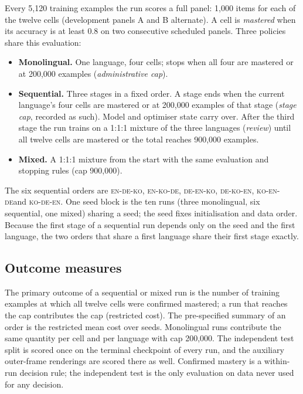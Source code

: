 \documentclass[preprint,12pt,authoryear]{elsarticle}
\newcommand{\ko}{\textsc{ko}}
\newcommand{\en}{\textsc{en}}
\newcommand{\de}{\textsc{de}}
\begin{document}
Every 5{,}120 training examples the run scores a full panel: 1{,}000 items for each of the twelve cells (development panels A and B alternate). A cell is \emph{mastered} when its accuracy is at least 0.8 on two consecutive scheduled panels. Three policies share this evaluation:

\begin{itemize}
\item \textbf{Monolingual.} One language, four cells; stops when all four are mastered or at 200{,}000 examples (\emph{administrative cap}).
\item \textbf{Sequential.} Three stages in a fixed order. A stage ends when the current language's four cells are mastered or at 200{,}000 examples of that stage (\emph{stage cap}, recorded as such). Model and optimiser state carry over. After the third stage the run trains on a 1:1:1 mixture of the three languages (\emph{review}) until all twelve cells are mastered or the total reaches 900{,}000 examples.
\item \textbf{Mixed.} A 1:1:1 mixture from the start with the same evaluation and stopping rules (cap 900{,}000).
\end{itemize}

The six sequential orders are \en-\de-\ko, \en-\ko-\de, \de-\en-\ko, \de-\ko-\en, \ko-\en-\de and \ko-\de-\en. One seed block is the ten runs (three monolingual, six sequential, one mixed) sharing a seed; the seed fixes initialisation and data order. Because the first stage of a sequential run depends only on the seed and the first language, the two orders that share a first language share their first stage exactly.

\subsection{Outcome measures}

The primary outcome of a sequential or mixed run is the number of training examples at which all twelve cells were confirmed mastered; a run that reaches the cap contributes the cap (restricted cost). The pre-specified summary of an order is the restricted mean cost over seeds. Monolingual runs contribute the same quantity per cell and per language with cap 200{,}000. The independent test split is scored once on the terminal checkpoint of every run, and the auxiliary outer-frame renderings are scored there as well. Confirmed mastery is a within-run decision rule; the independent test is the only evaluation on data never used for any decision.
\end{document}
